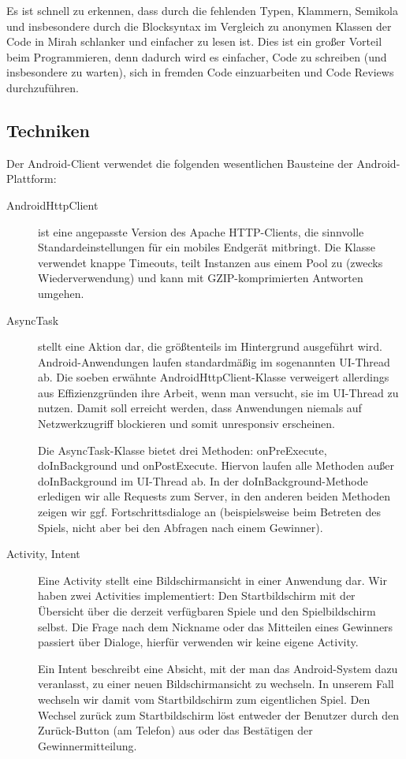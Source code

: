 \documentclass[12pt, a4paper]{scrartcl}
\begin{document}
Es ist schnell zu erkennen, dass durch die fehlenden Typen, Klammern, Semikola
und insbesondere durch die Blocksyntax im Vergleich zu anonymen Klassen der
Code in Mirah schlanker und einfacher zu lesen ist. Dies ist ein großer Vorteil
beim Programmieren, denn dadurch wird es einfacher, Code zu schreiben (und
insbesondere zu warten), sich in fremden Code einzuarbeiten und Code Reviews
durchzuführen.

\subsection{Techniken}

Der Android-Client verwendet die folgenden wesentlichen Bausteine der
Android-Plattform:

\begin{description}
	\item[AndroidHttpClient] ist eine angepasste Version des Apache
	HTTP-Clients, die sinnvolle Standardeinstellungen für ein mobiles
	Endgerät mitbringt. Die Klasse verwendet knappe Timeouts, teilt
	Instanzen aus einem Pool zu (zwecks Wie\-der\-ver\-wen\-dung) und kann mit
	GZIP-komprimierten Antworten umgehen.

	\item[AsyncTask] stellt eine Aktion dar, die größtenteils im
	Hintergrund ausgeführt wird. Android-Anwendungen laufen standardmäßig
	im sogenannten UI-Thread ab. Die soeben erwähnte
	AndroidHttpClient-Klasse verweigert allerdings aus Effizienzgründen
	ihre Arbeit, wenn man versucht, sie im UI-Thread zu nutzen. Damit soll
	erreicht werden, dass Anwendungen niemals auf Netzwerkzugriff
	blockieren und somit unresponsiv erscheinen.

	Die AsyncTask-Klasse bietet drei Methoden: onPreExecute, doInBackground
	und onPostExecute. Hiervon laufen alle Methoden außer doInBackground im
	UI-Thread ab. In der doInBackground-Methode erledigen wir alle Requests
	zum Server, in den anderen beiden Methoden zeigen wir ggf.
	Fortschrittsdialoge an (beispielsweise beim Betreten des Spiels, nicht
	aber bei den Abfragen nach einem Gewinner).

	\item[Activity, Intent] Eine Activity stellt eine Bildschirmansicht in
	einer Anwendung dar. Wir haben zwei Activities implementiert: Den
	Startbildschirm mit der Übersicht über die derzeit verfügbaren Spiele
	und den Spielbildschirm selbst. Die Frage nach dem Nickname oder das
	Mitteilen eines Gewinners passiert über Dialoge, hierfür verwenden wir
	keine eigene Activity.

	Ein Intent beschreibt eine Absicht, mit der man das Android-System dazu
	veranlasst, zu einer neuen Bildschirmansicht zu wechseln. In unserem
	Fall wechseln wir damit vom Startbildschirm zum eigentlichen Spiel. Den
	Wechsel zurück zum Startbildschirm löst entweder der Benutzer durch den
	Zurück-Button (am Telefon) aus oder das Bestätigen der
	Gewinnermitteilung.
\end{description}
\end{document}
